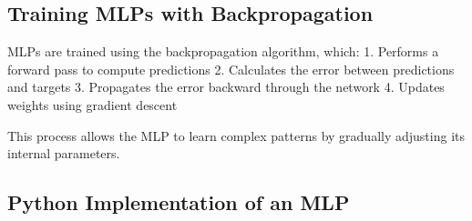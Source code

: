 \documentclass[
  letterpaper,
  DIV=11,
  numbers=noendperiod]{scrreprt}
\begin{document}
\subsection{Training MLPs with
Backpropagation}\label{training-mlps-with-backpropagation}

MLPs are trained using the backpropagation algorithm, which: 1. Performs
a forward pass to compute predictions 2. Calculates the error between
predictions and targets 3. Propagates the error backward through the
network 4. Updates weights using gradient descent

This process allows the MLP to learn complex patterns by gradually
adjusting its internal parameters.

\subsection{Python Implementation of an
MLP}\label{python-implementation-of-an-mlp}
\end{document}
